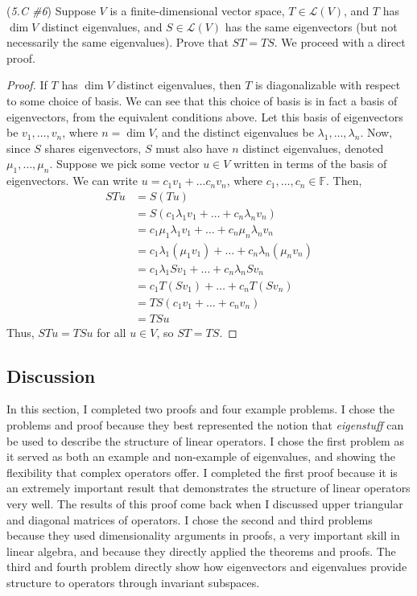 \documentclass{article}
\renewcommand{\L}{\mathcal{L}}
\newcommand{\F}{\mathbb{F}}
\theoremstyle{definition}
\begin{document}
\begin{problem}{(\textit{5.C \#6}) Suppose $V$ is a finite-dimensional vector space, $T \in \L(V)$, and $T$ has $\dim V$ distinct eigenvalues, and $S \in \L(V)$ has the same eigenvectors (but not necessarily the same eigenvalues). Prove that $ST = TS$.}
    We proceed with a direct proof.
    \begin{proof}
        If $T$ has $\dim V$ distinct eigenvalues, then $T$ is diagonalizable with respect to some choice of basis. We can see that this choice of basis is in fact a basis of eigenvectors, from the equivalent conditions above. Let this basis of eigenvectors be $v_1, \dots, v_n$, where $n = \dim V$, and the distinct eigenvalues be $\lambda_1, \dots, \lambda_n$. Now, since $S$ shares eigenvectors, $S$ must also have $n$ distinct eigenvalues, denoted $\mu_1, \dots, \mu_n$. Suppose we pick some vector $u \in V$ written in terms of the basis of eigenvectors. We can write $u = c_1v_1 + \dots c_nv_n$, where $c_1, \dots, c_n \in \F$. Then,
        \begin{align*}
            STu &= S(Tu) \\
            &= S(c_1\lambda_1v_1 + \dots + c_n\lambda_nv_n) \\
            &= c_1\mu_1\lambda_1v_1 + \dots + c_n\mu_n\lambda_nv_n \\
            &= c_1\lambda_1(\mu_1v_1) + \dots + c_n\lambda_n(\mu_nv_n) \\
            &= c_1\lambda_1Sv_1 + \dots + c_n\lambda_nSv_n \\
            &= c_1T(Sv_1) + \dots + c_nT(Sv_n) \\
            &= TS(c_1v_1 + \dots + c_nv_n) \\
            &= TSu
        \end{align*}
        Thus, $STu = TSu$ for all $u \in V$, so $ST = TS$.
    \end{proof}
\end{problem}

\subsection{Discussion}
In this section, I completed two proofs and four example problems. I chose the problems and proof because they best represented the notion that \textit{eigenstuff} can be used to describe the structure of linear operators. I chose the first problem as it served as both an example and non-example of eigenvalues, and showing the flexibility that complex operators offer. I completed the first proof because it is an extremely important result that demonstrates the structure of linear operators very well. The results of this proof come back when I discussed upper triangular and diagonal matrices of operators. I chose the second and third problems because they used dimensionality arguments in proofs, a very important skill in linear algebra, and because they directly applied the theorems and proofs. The third and fourth problem directly show how eigenvectors and eigenvalues provide structure to operators through invariant subspaces.
\end{document}
